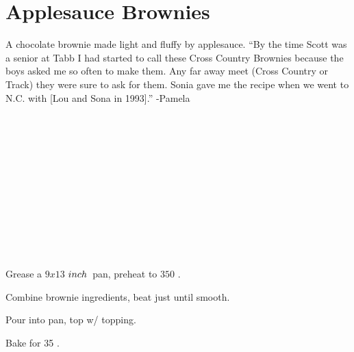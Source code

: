 \section[Applesauce Brownies]{Applesauce Brownies}


\begin{recipestats}[
	servings=16,
	preptime=15~\minute,
	bakingtime=35~\minute,
	source=Pam \& Sonia,
]
\end{recipestats}


\begin{recipeabstract}
	A chocolate brownie made light and fluffy by applesauce.
	``By the time Scott was a senior at Tabb I had started to call these Cross Country Brownies because the boys asked me so often to make them.
	Any far away meet (Cross Country or Track) they were sure to ask for them.
	Sonia gave me the recipe when we went to N.C. with [Lou and Sona in 1993].'' -Pamela
\end{recipeabstract}


\begin{ingredientcolumns}
	\begin{ingredientblock}[brownie]
		\\
		\\
		\\
		\\
		\\
		\\
		\\
		\\
	\end{ingredientblock}
	\begin{ingredientblock}[topping]
		\\
		\\
	\end{ingredientblock}
\end{ingredientcolumns}


\pagebreak[1] %
\begin{preparation}
\item Grease a $9x13$ $inch$~pan, preheat to $350$ \Fahrenheit.
\item Combine brownie ingredients, beat just until smooth.
\item Pour into pan, top w/ topping.
\item Bake for 35 \minute.
\end{preparation}


\recipeend%
